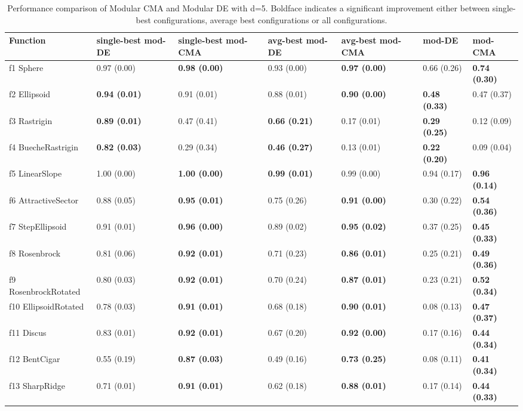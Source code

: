 \begin{table}
\caption{Performance comparison of Modular CMA and Modular DE with d=5. Boldface indicates a significant improvement either between single-best configurations, average best configurations or all configurations.}
\begin{tabular}{lllllll}
\toprule
Function & single-best mod-DE & single-best mod-CMA & avg-best mod-DE & avg-best mod-CMA & mod-DE & mod-CMA \\
\midrule
f1 Sphere & 0.97 (0.00) & \textbf{0.98 (0.00)} & 0.93 (0.00) & \textbf{0.97 (0.00)} & 0.66 (0.26) & \textbf{0.74 (0.30)} \\
f2 Ellipsoid & \textbf{0.94 (0.01)} & 0.91 (0.01) & 0.88 (0.01) & \textbf{0.90 (0.00)} & \textbf{0.48 (0.33)} & 0.47 (0.37) \\
f3 Rastrigin & \textbf{0.89 (0.01)} & 0.47 (0.41) & \textbf{0.66 (0.21)} & 0.17 (0.01) & \textbf{0.29 (0.25)} & 0.12 (0.09) \\
f4 BuecheRastrigin & \textbf{0.82 (0.03)} & 0.29 (0.34) & \textbf{0.46 (0.27)} & 0.13 (0.01) & \textbf{0.22 (0.20)} & 0.09 (0.04) \\
f5 LinearSlope & 1.00 (0.00) & \textbf{1.00 (0.00)} & \textbf{0.99 (0.01)} & 0.99 (0.00) & 0.94 (0.17) & \textbf{0.96 (0.14)} \\
f6 AttractiveSector & 0.88 (0.05) & \textbf{0.95 (0.01)} & 0.75 (0.26) & \textbf{0.91 (0.00)} & 0.30 (0.22) & \textbf{0.54 (0.36)} \\
f7 StepEllipsoid & 0.91 (0.01) & \textbf{0.96 (0.00)} & 0.89 (0.02) & \textbf{0.95 (0.02)} & 0.37 (0.25) & \textbf{0.45 (0.33)} \\
f8 Rosenbrock & 0.81 (0.06) & \textbf{0.92 (0.01)} & 0.71 (0.23) & \textbf{0.86 (0.01)} & 0.25 (0.21) & \textbf{0.49 (0.36)} \\
f9 RosenbrockRotated & 0.80 (0.03) & \textbf{0.92 (0.01)} & 0.70 (0.24) & \textbf{0.87 (0.01)} & 0.23 (0.21) & \textbf{0.52 (0.34)} \\
f10 EllipsoidRotated & 0.78 (0.03) & \textbf{0.91 (0.01)} & 0.68 (0.18) & \textbf{0.90 (0.01)} & 0.08 (0.13) & \textbf{0.47 (0.37)} \\
f11 Discus & 0.83 (0.01) & \textbf{0.92 (0.01)} & 0.67 (0.20) & \textbf{0.92 (0.00)} & 0.17 (0.16) & \textbf{0.44 (0.34)} \\
f12 BentCigar & 0.55 (0.19) & \textbf{0.87 (0.03)} & 0.49 (0.16) & \textbf{0.73 (0.25)} & 0.08 (0.11) & \textbf{0.41 (0.34)} \\
f13 SharpRidge & 0.71 (0.01) & \textbf{0.91 (0.01)} & 0.62 (0.18) & \textbf{0.88 (0.01)} & 0.17 (0.14) & \textbf{0.44 (0.33)} \\

\end{tabular}
\end{table}
